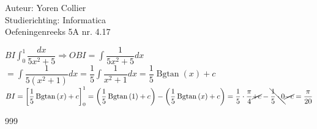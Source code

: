 \documentclass[a4paper]{article}
\newcommand{\adR}{\Rightarrow} %
\newcommand{\Lh}{\left(} %
\newcommand{\Rh}{\right)}
\newcommand{\Lv}{\left[} %
\newcommand{\Rv}{\right]}
\newcommand{\schrap}{\cancel}
\newcommand{\schrapb}{\bcancel} %
\newcommand{\intgrl}{\displaystyle\int} %
\begin{document}
\noindent \large Auteur: Yoren Collier \\
\noindent \large Studierichting: Informatica\\
\noindent \large Oefeningenreeks 5A nr. 4.17\\

\medskip

\normalsize

$ BI \intgrl_0^1 \dfrac{dx}{5x^2 +5} \adR OBI = \intgrl \dfrac{1}{5x^2 +5} dx$\\

$= \intgrl \dfrac{1}{5 \Lh x^2 +1 \Rh} dx = \dfrac{1}{5} \intgrl \dfrac{1}{x^2 +1} dx = \dfrac{1}{5} \operatorname{Bgtan} \Lh x \Rh +c$\\

$BI = \Lv \dfrac{1}{5} \operatorname{Bgtan} \Lh x \Rh +c \Rv_0^1 = \Lh \dfrac{1}{5} \operatorname{Bgtan} \Lh 1 \Rh +c \Rh - \Lh \dfrac{1}{5} \operatorname{Bgtan} \Lh x \Rh +c \Rh = \dfrac{1}{5} \cdot \dfrac{\pi}{4} \schrap{+c} - \schrapb{\dfrac{1}{5} \cdot 0} \schrap{-c} =\dfrac{\pi}{20}$\\

\begin{thebibliography}{999}
\end{thebibliography}
\end{document}
